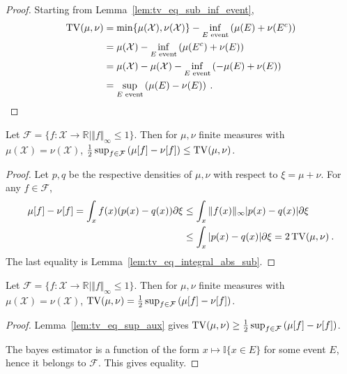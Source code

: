 \begin{proof}%
{}
Starting from Lemma~\ref{lem:tv_eq_sub_inf_event},
\begin{align*}
\operatorname{TV}(\mu, \nu)
&= \min\{\mu(\mathcal X), \nu(\mathcal X)\} - \inf_{E \text{ event}} \left( \mu(E) + \nu(E^c) \right)
\\
&= \mu(\mathcal X) - \inf_{E \text{ event}} \left( \mu(E^c) + \nu(E) \right)
\\
&= \mu(\mathcal X) - \mu(\mathcal X) - \inf_{E \text{ event}} \left( -\mu(E) + \nu(E) \right)
\\
&= \sup_{E \text{ event}} \left( \mu(E) - \nu(E) \right)
\: .
\end{align*}
\end{proof}


\begin{lemma}
  \label{lem:tv_eq_sup_aux}
  Let $\mathcal F = \{f : \mathcal X \to \mathbb{R} \mid \Vert f \Vert_\infty \le 1\}$.
  Then for $\mu, \nu$ finite measures with $\mu(\mathcal X) = \nu(\mathcal X)$, $\frac{1}{2} \sup_{f \in \mathcal F} \left( \mu[f] - \nu[f] \right) \le \operatorname{TV}(\mu, \nu)$.
\end{lemma}

\begin{proof}
Let $p,q$ be the respective densities of $\mu, \nu$ with respect to $\xi=\mu+\nu$.
For any $f \in \mathcal F$,
\begin{align*}
\mu[f] - \nu[f]
= \int_x f(x)(p(x) - q(x)) \partial\xi
&\le \int_x \Vert f(x) \Vert_\infty \vert p(x) - q(x) \vert \partial\xi
\\
&\le \int_x \vert p(x) - q(x) \vert \partial\xi
= 2 \operatorname{TV}(\mu, \nu)
\: .
\end{align*}
The last equality is Lemma~\ref{lem:tv_eq_integral_abs_sub}.
\end{proof}


\begin{theorem}
  \label{thm:tv_eq_sup_sub_integral}
  Let $\mathcal F = \{f : \mathcal X \to \mathbb{R} \mid \Vert f \Vert_\infty \le 1\}$.
  Then for $\mu, \nu$ finite measures with $\mu(\mathcal X) = \nu(\mathcal X)$, $\operatorname{TV}(\mu, \nu) = \frac{1}{2} \sup_{f \in \mathcal F} \left( \mu[f] - \nu[f] \right)$.
\end{theorem}

\begin{proof}
Lemma~\ref{lem:tv_eq_sup_aux} gives $\operatorname{TV}(\mu, \nu) \ge \frac{1}{2} \sup_{f \in \mathcal F} \left( \mu[f] - \nu[f] \right)$.

The bayes estimator is a function of the form $x \mapsto \mathbb{I}\{x \in E\}$ for some event $E$, hence it belongs to $\mathcal F$. This gives equality.
\end{proof}


